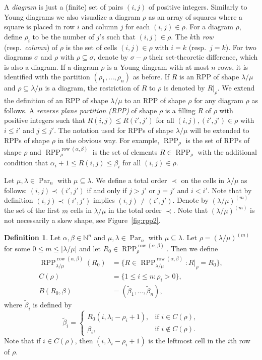 \documentclass[12pt]{amsart}
\numberwithin{equation}{section}
\theoremstyle{definition}
\newtheorem{defn}[thm]{Definition}
\newcommand\wb{\widetilde{\beta}}
\newcommand\row{\operatorname{row}}
\newcommand\NN{\mathbb{N}}
\newcommand\Par{\operatorname{Par}}
\newcommand\RPP{\operatorname{RPP}}
\newcommand\lm{{\lambda/\mu}}
\begin{document}
A \emph{diagram} is just a (finite) set of pairs $(i,j)$ of positive integers.
Similarly to Young diagrams we also visualize a diagram $\rho$ as an array of
squares where a square is placed in row $i$ and column $j$ for each
$(i,j)\in\rho$. For a diagram $\rho$, define $\rho_i$ to be the number of $j$'s
such that $(i,j)\in\rho$. The $k$th \emph{row} (resp.~\emph{column}) of $\rho$
is the set of cells $(i,j)\in\rho$ with $i=k$ (resp.~\textbf{$j=k$}). For two
diagrams $\sigma$ and $\rho$ with $\rho\subseteq\sigma$, denote by $\sigma-\rho$
their set-theoretic difference, which is also a diagram. If a diagram $\rho$ is
a Young diagram with at most $n$ rows, it is identified with the partition
$(\rho_1,\dots,\rho_n)$ as before. If $R$ is an RPP of shape $\lm$ and
$\rho\subseteq\lm$ is a diagram, the restriction of $R$ to $\rho$ is denoted by
$R|_\rho$. We extend the definition of an RPP of shape $\lm$ to an RPP of shape
$\rho$ for any diagram $\rho$ as follows. A \emph{reverse plane partition (RPP)}
of shape $\rho$ is a filling $R$ of $\rho$ with positive integers such that
$R(i,j)\le R(i',j')$ for all $(i,j),(i',j')\in\rho$ with $i\le i'$ and $j\le
j'$. The notation used for RPPs of shape $\lm$ will be extended to RPPs of shape
$\rho$ in the obvious way. For example, $\RPP_{\rho}$ is the set of RPPs of
shape $\rho$ and $\RPP^{\row(\alpha,\beta)}_{\rho}$ is the set of elements
$R\in\RPP_{\rho}$ with the additional condition that $\alpha_i+1\le R(i,j)\le
\beta_i$ for all $(i,j)\in\rho$.

Let $\mu,\lambda\in\Par_n$ with $\mu\subseteq\lambda$. We define a total order
$\prec$ on the cells in $\lm$ as follows: $(i,j) \prec (i',j')$ if and only if
$j>j'$ or $j=j'$ and $i<i'$. Note that by definition $(i,j) \prec (i',j')$
implies $(i,j)\ne (i',j')$. Denote by $(\lm)^{(m)}$ the set of the first $m$
cells in $\lm$ in the total order $\prec$. Note that $(\lm)^{(m)}$ is not
necessarily a skew shape, see Figure~\ref{fig:rpp2}. 


\begin{defn}\label{defn:R0}
  Let $\alpha,\beta\in\NN^n$ and $\mu,\lambda\in\Par_n$ with
  $\mu\subseteq\lambda$. Let $\rho=(\lm)^{(m)}$ for some $0\le m\le|\lm|$ and
  let $R_0\in \RPP^{\row(\alpha,\beta)}_{\rho}$. Then we define
\begin{align*}
  \RPP^{\row(\alpha,\beta)}_{\lm}(R_0) 
  &=\{R\in \RPP^{\row(\alpha,\beta)}_{\lm}: R|_\rho = R_0\},\\
 C(\rho)&=\{1\le i\le n: \rho_i>0\},\\
B(R_0,\beta)&=(\wb_1,\dots,\wb_n),
\end{align*}
where $\wb_i$ is defined by
\[
    \wb_i=
\begin{cases}
  R_0(i,\lambda_i-\rho_i+1), & \mbox{if $i\in C(\rho)$},\\
  \beta_i, & \mbox{if $i\notin C(\rho)$}.
\end{cases}
\]
Note that if $i\in C(\rho)$, then $(i,\lambda_i-\rho_i+1)$ is the leftmost cell
in the $i$th row of $\rho$.
\end{defn}
\end{document}

